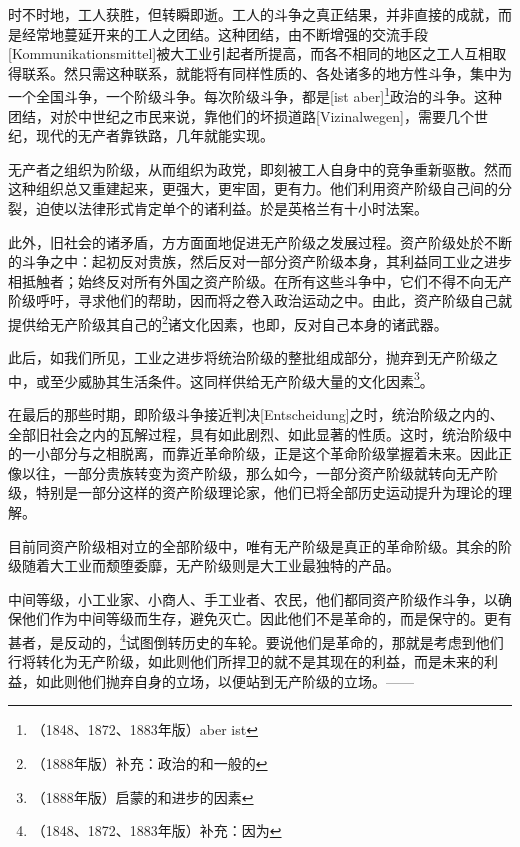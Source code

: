 \documentclass[a4paper,12pt]{ctexart}
\begin{document}

时不时地，工人获胜，但转瞬即逝。工人的斗争之真正结果，并非直接的成就，而是经常地蔓延开来的工人之团结。这种团结，由不断增强的交流手段[Kommunikationsmittel]被大工业引起者所提高，而各不相同的地区之工人互相取得联系。然只需这种联系，就能将有同样性质的、各处诸多的地方性斗争，集中为一个全国斗争，一个阶级斗争。每次阶级斗争，都是[ist aber]\footnote{（1848、1872、1883年版）aber ist}政治的斗争。这种团结，对於中世纪之市民来说，靠他们的坏损道路[Vizinalwegen]，需要几个世纪，现代的无产者靠铁路，几年就能实现。

无产者之组织为阶级，从而组织为政党，即刻被工人自身中的竞争重新驱散。然而这种组织总又重建起来，更强大，更牢固，更有力。他们利用资产阶级自己间的分裂，迫使以法律形式肯定单个的诸利益。於是英格兰有十小时法案。


此外，旧社会的诸矛盾，方方面面地促进无产阶级之发展过程。资产阶级处於不断的斗争之中：起初反对贵族，然后反对一部分资产阶级本身，其利益同工业之进步相抵触者；始终反对所有外国之资产阶级。在所有这些斗争中，它们不得不向无产阶级呼吁，寻求他们的帮助，因而将之卷入政治运动之中。由此，资产阶级自己就提供给无产阶级其自己的\footnote{（1888年版）补充：政治的和一般的}诸文化因素，也即，反对自己本身的诸武器。

此后，如我们所见，工业之进步将统治阶级的整批组成部分，抛弃到无产阶级之中，或至少威胁其生活条件。这同样供给无产阶级大量的文化因素\footnote{（1888年版）启蒙的和进步的因素}。

在最后的那些时期，即阶级斗争接近判决[Entscheidung]之时，统治阶级之内的、全部旧社会之内的瓦解过程，具有如此剧烈、如此显著的性质。这时，统治阶级中的一小部分与之相脱离，而靠近革命阶级，正是这个革命阶级掌握着未来。因此正像以往，一部分贵族转变为资产阶级，那么如今，一部分资产阶级就转向无产阶级，特别是一部分这样的资产阶级理论家，他们已将全部历史运动提升为理论的理解。

目前同资产阶级相对立的全部阶级中，唯有无产阶级是真正的革命阶级。其余的阶级随着大工业而颓堕委靡，无产阶级则是大工业最独特的产品。


中间等级，小工业家、小商人、手工业者、农民，他们都同资产阶级作斗争，以确保他们作为中间等级而生存，避免灭亡。因此他们不是革命的，而是保守的。更有甚者，是反动的，\footnote{（1848、1872、1883年版）补充：因为}试图倒转历史的车轮。要说他们是革命的，那就是考虑到他们行将转化为无产阶级，如此则他们所捍卫的就不是其现在的利益，而是未来的利益，如此则他们抛弃自身的立场，以便站到无产阶级的立场。——
\end{document}
